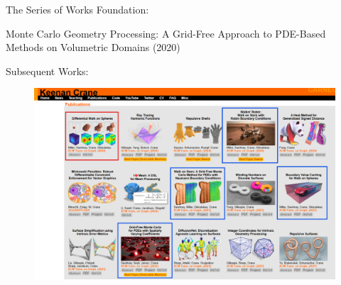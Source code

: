 \documentclass{beamer}
\begin{document}
\begin{frame}{The Series of Works}
	Foundation: 

	Monte Carlo Geometry Processing: A Grid-Free Approach to PDE-Based Methods on Volumetric Domains (2020)

	Subsequent Works:
	\begin{figure}
		\centering
		\includegraphics[scale=0.25]{img/related-works.png}
	\end{figure}
\end{frame}







\thankframe
\end{document}
